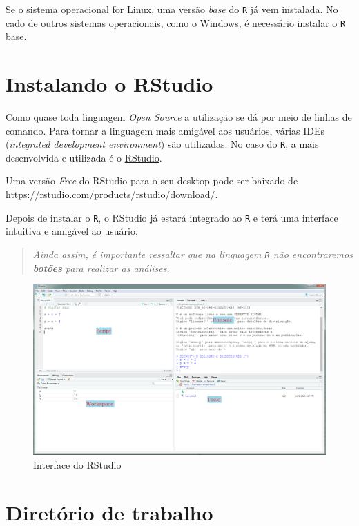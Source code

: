 \documentclass[
]{book}
\begin{document}
Se o sistema operacional for Linux, uma versão \emph{base} do \texttt{R} já vem instalada. No cado de outros sistemas operacionais, como o Windows, é necessário instalar o \texttt{R} \href{https://cran.r-project.org/bin/windows/base/}{base}.

\hypertarget{instalando-o-rstudio}{%
\section{Instalando o RStudio}\label{instalando-o-rstudio}}

Como quase toda linguagem \emph{Open Source} a utilização se dá por meio de linhas de comando. Para tornar a linguagem mais amigável aos usuários, várias IDEs (\emph{integrated development environment}) são utilizadas. No caso do \texttt{R}, a mais desenvolvida e utilizada é o \href{https://rstudio.com/products/rstudio/}{RStudio}.

Uma versão \emph{Free} do RStudio para o seu desktop pode ser baixado de \url{https://rstudio.com/products/rstudio/download/}.

Depois de instalar o \texttt{R}, o RStudio já estará integrado ao \texttt{R} e terá uma interface intuitiva e amigável ao usuário.

\begin{quote}
\emph{Ainda assim, é importante ressaltar que na linguagem \texttt{R} não encontraremos \textbf{botões} para realizar as análises.}
\end{quote}

\begin{figure}
\includegraphics[width=0.9\linewidth]{Figuras/RStudio} \caption{Interface do RStudio}\label{fig:rstudio}
\end{figure}

\hypertarget{diretuxf3rio-de-trabalho}{%
\section{Diretório de trabalho}\label{diretuxf3rio-de-trabalho}}
\end{document}
